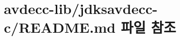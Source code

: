 \hypertarget{avdecc-lib_2jdksavdecc-c_2_r_e_a_d_m_e_8md}{}\section{avdecc-\/lib/jdksavdecc-\/c/\+R\+E\+A\+D\+ME.md 파일 참조}
\label{avdecc-lib_2jdksavdecc-c_2_r_e_a_d_m_e_8md}
